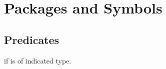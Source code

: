 %
%

\section{Packages and Symbols}

\subsection{Predicates}
\begin{LIST}{1cm}

  {
  \retval{\T} if  is of indicated type.
  }

\end{LIST}


